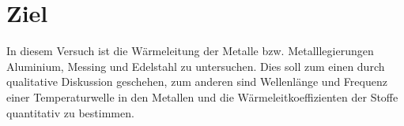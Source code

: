 \section{Ziel}
\label{sec:Ziel}
In diesem Versuch ist die Wärmeleitung der Metalle bzw. Metalllegierungen
Aluminium, Messing und Edelstahl zu untersuchen. Dies soll zum einen durch
qualitative Diskussion geschehen, zum anderen sind Wellenlänge und Frequenz
einer Temperaturwelle in den Metallen und die Wärmeleitkoeffizienten der Stoffe
quantitativ zu bestimmen.
